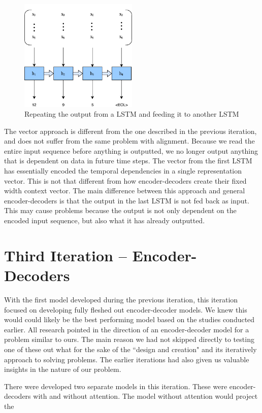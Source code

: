\begin{figure}[ht]
    \centering
    \includegraphics[width=0.5\textwidth]{fig/development_process/lstm-vector-projection-decoder.pdf}
    \caption{Repeating the output from a LSTM and feeding it to another LSTM}
    \label{fig:lstm-vector-projection-decoder}
\end{figure}

The vector approach is different from the one described in the previous iteration, and does not suffer from the same problem with alignment. Because we read the entire input sequence before anything is outputted, we no longer output anything that is dependent on data in future time steps. The vector from the first LSTM has essentially encoded the temporal dependencies in a single representation vector. This is not that different from how encoder-decoders create their fixed width context vector. The main difference between this approach and general encoder-decoders is that the output in the last LSTM is not fed back as input. This may cause problems because the output is not only dependent on the encoded input sequence, but also what it has already outputted.


\section{Third Iteration -- Encoder-Decoders}
With the first model developed during the previous iteration, this iteration focused on developing fully fleshed out encoder-decoder models. We knew this would could likely be the best performing model based on the studies conducted earlier. All research pointed in the direction of an encoder-decoder model for a problem similar to ours. The main reason we had not skipped directly to testing one of these out what for the sake of the ``design and creation" and its iteratively approach to solving problems. The earlier iterations had also given us valuable insights in the nature of our problem.

There were developed two separate models in this iteration. These were encoder-decoders with and without attention. The model without attention would project the 

